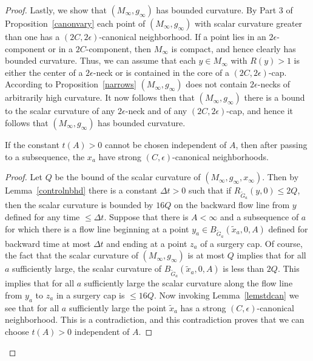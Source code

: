 \begin{proof}
Lastly, we show that $(M_\infty,g_\infty)$ has bounded curvature. By Part 3 of Proposition~\ref{canonvary}
each point of $(M_\infty,g_\infty)$ with scalar curvature
greater than one has a $(2C,2\epsilon)$-canonical neighborhood. If a point lies in an $2\epsilon$-component
or in a $2C$-component, then $M_\infty$ is compact, and hence clearly has bounded curvature.
Thus, we can assume that each $y\in M_\infty$ with $R(y)>1$ is either the center of a $2\epsilon$-neck
or is contained in the core of a $(2C,2\epsilon)$-cap. According to Proposition~\ref{narrows}
 $(M_\infty,g_\infty)$ does not contain $2\epsilon$-necks of arbitrarily high curvature.
 It now follows then that $(M_\infty,g_\infty)$ there is a bound to the scalar curvature of any
 $2\epsilon$-neck and of any $(2C,2\epsilon)$-cap, and hence it follows that $(M_\infty,g_\infty)$
 has bounded curvature.


\begin{claim}
\label{claim:uniform-t-prime-independent-of-A}
If the constant $t(A)>0$ cannot be chosen independent of $A$, then
after passing to a subsequence, the $x_a$ have strong
$(C,\epsilon)$-canonical neighborhoods.
\end{claim}

\begin{proof}
 Let $Q$ be the bound of the scalar curvature of
$(M_\infty,g_\infty,x_\infty)$. Then by Lemma~\ref{controlnbhd}
 there is a constant
$\Delta t>0$ such that if $R_{\widetilde G_a}(y,0)\le 2Q$, then the
scalar curvature is bounded by $16Q$ on the backward flow line from
$y$ defined for any time $\le \Delta t$. Suppose that there is
$A<\infty$ and a  subsequence of $a$ for which there is a flow line
beginning at a point $y_a \in B_{\widetilde G_a}(\tilde x_a,0,A)$
defined for backward time at most $\Delta t$ and ending at a point
$z_a$ of a surgery cap. Of course, the fact that the scalar
curvature of $(M_\infty,g_\infty)$ is at most $Q$ implies that for
all $a$ sufficiently large, the scalar curvature of $B_{\widetilde
G_a}(\tilde x_a,0,A)$ is less than $2Q$. This implies  that for all
$a$ sufficiently large the scalar curvature along the flow line
from $y_a$ to $z_a$ in a surgery cap is $\le 16Q$. Now invoking
Lemma~\ref{lemstdcan} we see that for all $a$ sufficiently large the
point $\widetilde x_a$ has a strong $(C,\epsilon)$-canonical
neighborhood. This is a contradiction, and this contradiction proves
that we can choose $t(A)>0$ independent of $A$.
\end{proof}



\end{proof}

